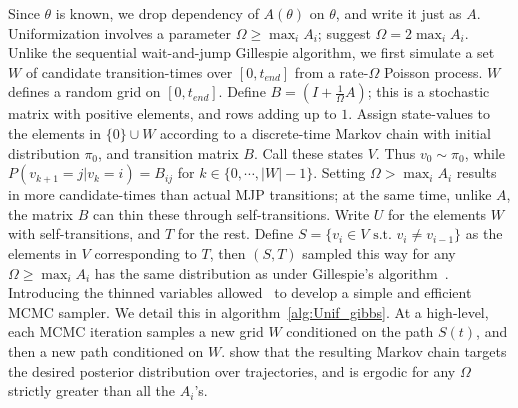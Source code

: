 Since $\theta$ is known, we drop dependency of $A(\theta)$ on $\theta$, and write it just as $A$. 
Uniformization involves a parameter $\Omega \ge \max_i A_i$; \cite{RaoTeh13} suggest $\Omega = 2 \max_i A_i$. 
Unlike the sequential wait-and-jump Gillespie algorithm, we first simulate a set $W$ of candidate transition-times over $[0,t_{end}]$ from a rate-$\Omega$ Poisson process. 
$W$ defines a random grid on $[0,t_{end}]$.
Define $B = \left(I +\frac{1}{\Omega}A\right)$; this is a stochastic matrix with positive elements, and rows adding up to $1$.
Assign state-values to the elements in $\{0\} \cup W$ according to a discrete-time Markov chain with initial distribution $\pi_0$, and transition matrix $B$.
Call these states $V$. 
Thus $v_0 \sim \pi_0$, while $P(v_{k+1}=j|v_k=i) = B_{ij}$ for $k \in \{0,\cdots,|W|-1\}$.
Setting $\Omega > \max_i A_i$ results in more candidate-times than actual MJP transitions; at the same time, unlike $A$, the matrix $B$ can thin these through self-transitions. 
Write $U$ for the elements $W$ with self-transitions, and $T$ for the rest.
Define $S=\{v_i \in V \text{ s.t.\ } v_i \neq v_{i-1}\}$ as the elements in $V$ corresponding to $T$, then $(S,T)$ sampled this way for any $\Omega \ge \max_i A_i$
has the same distribution as under Gillespie's algorithm~\citep{Jen1953,RaoTeh13}.
Introducing the thinned variables allowed~\cite{RaoTeh13} to develop a simple and efficient MCMC sampler. 
We detail this in algorithm~\ref{alg:Unif_gibbs}. 
At a high-level, each MCMC iteration samples a new grid $W$ conditioned on the path $S(t)$, and then a new path conditioned on $W$. 
\cite{RaoTeh13} show that the resulting Markov chain targets the desired posterior distribution over trajectories, and is ergodic for any $\Omega$ strictly greater than all the $A_i$'s. 
